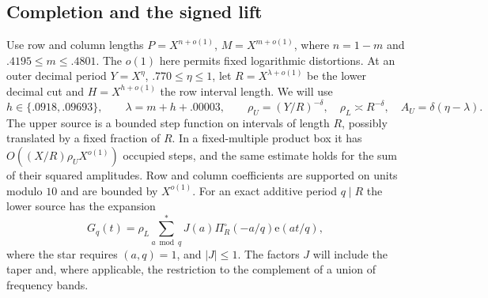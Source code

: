 \documentclass[11pt,a4paper]{article}
\theoremstyle{paperplain}
\numberwithin{equation}{section}
\newcommand{\e}{\mathrm e}
\begin{document}
\subsection{Completion and the signed lift}

Use row and column lengths \(P=X^{n+o(1)}\), \(M=X^{m+o(1)}\),
where \(n=1-m\) and \(.4195\le m\le .4801\). The \(o(1)\) here
permits fixed logarithmic distortions. At an outer decimal
period \(Y=X^\eta\), \(.770\le\eta\le1\), let \(R=X^{\lambda+o(1)}\)
be the lower decimal cut and \(H=X^{h+o(1)}\) the row interval
length. We will use
\begin{equation}
  h\in\{.0918,.09693\},\qquad \lambda=m+h+.00003,
  \qquad
  \rho_U=(Y/R)^{-\delta},\quad \rho_L\asymp R^{-\delta},\quad
  A_U=\delta(\eta-\lambda).
 \label{dt:gram-scales}
\end{equation}
The upper source is a bounded step function on intervals of
length \(R\), possibly translated by a fixed fraction of \(R\).
In a fixed-multiple product box it has
\(O((X/R)\rho_U X^{o(1)})\) occupied steps, and the same estimate
holds for the sum of their squared amplitudes. Row and column
coefficients are supported on units modulo \(10\) and are bounded
by \(X^{o(1)}\). For an exact additive period \(q\mid R\) the lower
source has the expansion
\begin{equation}
 G_q(t)=\rho_L\sum_{a\bmod q}^{*}
                    J(a)\Pi_R^\circ(-a/q)\e(at/q),
 \label{dt:gram-lower-source}
\end{equation}
where the star requires \((a,q)=1\), and \(|J|\le1\).
The factors \(J\) will include the taper and, where applicable,
the restriction to the complement of a union of frequency bands.
\end{document}
